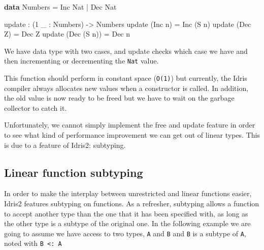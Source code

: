 \documentclass[
]{article}
\newenvironment{Shaded}{}{}
\newcommand{\DataTypeTok}[1]{\textcolor[rgb]{0.56,0.13,0.00}{#1}}
\newcommand{\DecValTok}[1]{\textcolor[rgb]{0.25,0.63,0.44}{#1}}
\newcommand{\KeywordTok}[1]{\textcolor[rgb]{0.00,0.44,0.13}{\textbf{#1}}}
\newcommand{\NormalTok}[1]{#1}
\newcommand{\OperatorTok}[1]{\textcolor[rgb]{0.40,0.40,0.40}{#1}}
\newcommand{\OtherTok}[1]{\textcolor[rgb]{0.00,0.44,0.13}{#1}}
\begin{document}
\begin{Shaded}
\begin{Highlighting}[]
\KeywordTok{data} \DataTypeTok{Numbers} \OtherTok{=} \DataTypeTok{Inc} \DataTypeTok{Nat} \OperatorTok{|} \DataTypeTok{Dec} \DataTypeTok{Nat}

\NormalTok{update }\OperatorTok{:}\NormalTok{ (}\DecValTok{1}\NormalTok{ \_ }\OperatorTok{:} \DataTypeTok{Numbers}\NormalTok{) }\OtherTok{{-}\textgreater{}} \DataTypeTok{Numbers}
\NormalTok{update (}\DataTypeTok{Inc}\NormalTok{ n) }\OtherTok{=} \DataTypeTok{Inc}\NormalTok{ (}\DataTypeTok{S}\NormalTok{ n)}
\NormalTok{update (}\DataTypeTok{Dec} \DataTypeTok{Z}\NormalTok{) }\OtherTok{=} \DataTypeTok{Dec} \DataTypeTok{Z}
\NormalTok{update (}\DataTypeTok{Dec}\NormalTok{ (}\DataTypeTok{S}\NormalTok{ n)) }\OtherTok{=} \DataTypeTok{Dec}\NormalTok{ n}
\end{Highlighting}
\end{Shaded}

We have data type with two cases, and update checks which case we have
and then incrementing or decrementing the \texttt{Nat} value.

This function should perform in constant space (\texttt{O(1)}) but
currently, the Idris compiler always allocates new values when a
constructor is called. In addition, the old value is now ready to be
freed but we have to wait on the garbage collector to catch it.

Unfortunately, we cannot simply implement the free and update feature in
order to see what kind of performance improvement we can get out of
linear types. This is due to a feature of Idris2: subtyping.

\hypertarget{linear-function-subtyping}{%
\subsection{Linear function subtyping}\label{linear-function-subtyping}}

In order to make the interplay between unrestricted and linear functions
easier, Idris2 features subtyping on functions. As a refresher,
subtyping allows a function to accept another type than the one that it
has been specified with, as long as the other type is a subtype of the
original one. In the following example we are going to assume we have
access to two types, \texttt{A} and \texttt{B} and \texttt{B} is a
subtype of \texttt{A}, noted with \texttt{B\ \textless{}:\ A}
\end{document}
